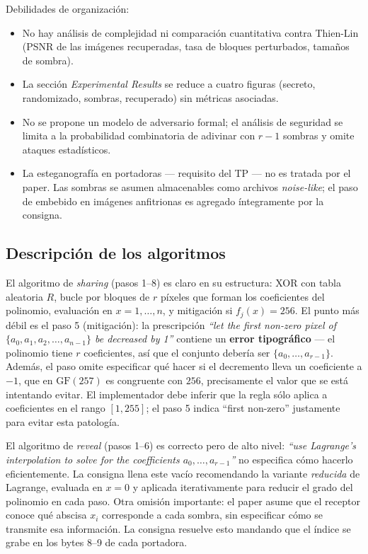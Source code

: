 \documentclass[11pt,a4paper]{article}
\begin{document}
Debilidades de organización:
\begin{itemize}[leftmargin=*,nosep]
    \item No hay análisis de complejidad ni comparación cuantitativa contra
          Thien-Lin (PSNR de las imágenes recuperadas, tasa de bloques
          perturbados, tamaños de sombra).
    \item La sección \emph{Experimental Results} se reduce a cuatro
          figuras (secreto, randomizado, sombras, recuperado) sin
          métricas asociadas.
    \item No se propone un modelo de adversario formal; el análisis de
          seguridad se limita a la probabilidad combinatoria de adivinar
          con $r-1$ sombras y omite ataques estadísticos.
    \item La esteganografía en portadoras --- requisito del TP --- no es
          tratada por el paper. Las sombras se asumen almacenables como
          archivos \emph{noise-like}; el paso de embebido en imágenes
          anfitrionas es agregado íntegramente por la consigna.
\end{itemize}

\subsection*{Descripción de los algoritmos}

El algoritmo de \emph{sharing} (pasos 1--8) es claro en su estructura: XOR
con tabla aleatoria $R$, bucle por bloques de $r$ píxeles que forman los
coeficientes del polinomio, evaluación en $x=1,\dots,n$, y mitigación si
$f_j(x)=256$. El punto más débil es el paso 5 (mitigación): la
prescripción \emph{``let the first non-zero pixel of
$\{a_0, a_1, a_2, \dots, a_{n-1}\}$ be decreased by 1''} contiene un
\textbf{error tipográfico} --- el polinomio tiene $r$ coeficientes, así que
el conjunto debería ser $\{a_0,\dots,a_{r-1}\}$. Además, el paso omite
especificar qué hacer si el decremento lleva un coeficiente a $-1$, que en
$\mathrm{GF}(257)$ es congruente con $256$, precisamente el valor que se
está intentando evitar. El implementador debe inferir que la regla sólo
aplica a coeficientes en el rango $[1,255]$; el paso 5 indica
``first non-zero'' justamente para evitar esta patología.

El algoritmo de \emph{reveal} (pasos 1--6) es correcto pero de alto nivel:
\emph{``use Lagrange's interpolation to solve for the coefficients
$a_0, \dots, a_{r-1}$''} no especifica cómo hacerlo eficientemente. La
consigna llena este vacío recomendando la variante \emph{reducida} de
Lagrange, evaluada en $x=0$ y aplicada iterativamente para reducir el
grado del polinomio en cada paso. Otra omisión importante: el paper asume
que el receptor conoce qué abscisa $x_i$ corresponde a cada sombra, sin
especificar cómo se transmite esa información. La consigna resuelve esto
mandando que el índice se grabe en los bytes 8--9 de cada portadora.
\end{document}
